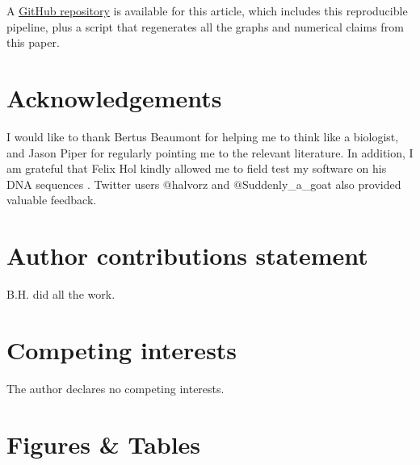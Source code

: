 \documentclass[fleqn,10pt]{wlscirep}
\begin{document}
A \href{https://github.com/berthubert/skewdb-articles}{GitHub repository} is available for this article, which includes this reproducible pipeline, plus a script that regenerates all the graphs and numerical claims from this paper. 



\section*{Acknowledgements} 

I would like to thank Bertus Beaumont for helping me to think like a biologist, and Jason Piper for regularly pointing me to the relevant literature. In addition, I am grateful that Felix Hol kindly allowed me to field test my software on his DNA sequences \cite{hol_density-dependent_2016}. Twitter users $@$halvorz and $@$Suddenly\_a\_goat also provided valuable feedback.

\section*{Author contributions statement}

B.H. did all the work.

\section*{Competing interests}
The author declares no competing interests.

\section*{Figures \& Tables}
\newcommand{\comment}[1]{}

\comment{
}
\end{document}
